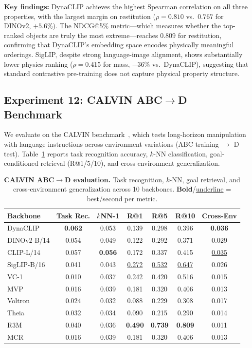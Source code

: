\documentclass{article}
\newcommand{\methodname}{DynaCLIP}
\newcommand{\best}[1]{\textbf{#1}}
\newcommand{\second}[1]{\underline{#1}}
\begin{document}
\textbf{Key findings:} \methodname{} achieves the highest Spearman correlation on all three properties, with the largest margin on restitution ($\rho{=}0.810$ vs.\ $0.767$ for DINOv2, $+5.6\%$). The NDCG@5\% metric---which measures whether the top-ranked objects are truly the most extreme---reaches $0.809$ for restitution, confirming that \methodname{}'s embedding space encodes physically meaningful orderings. SigLIP, despite strong language-image alignment, shows substantially lower physics ranking ($\rho{=}0.415$ for mass, $-36\%$ vs.\ \methodname{}), suggesting that standard contrastive pre-training does not capture physical property structure.


\subsection{Experiment 12: CALVIN ABC$\to$D Benchmark}
\label{sec:exp_calvin}

We evaluate on the CALVIN benchmark~\cite{mees2022calvin}, which tests long-horizon manipulation with language instructions across environment variations (ABC training $\to$ D test). Table~\ref{tab:calvin} reports task recognition accuracy, $k$-NN classification, goal-conditioned retrieval (R@1/5/10), and cross-environment generalization.

\begin{table}[t]
\centering
\caption{\textbf{CALVIN ABC$\to$D evaluation.} Task recognition, $k$-NN, goal retrieval, and cross-environment generalization across 10 backbones. \best{Bold}/\second{underline} = best/second per metric.}
\label{tab:calvin}
\small
\setlength{\tabcolsep}{3pt}
\begin{tabular}{@{}lcccccc@{}}
\toprule
\textbf{Backbone} & \textbf{Task Rec.} & \textbf{$k$NN-1} & \textbf{R@1} & \textbf{R@5} & \textbf{R@10} & \textbf{Cross-Env} \\
\midrule
\methodname{} & \best{0.062} & 0.053 & 0.139 & 0.298 & 0.396 & \best{0.036} \\
DINOv2-B/14 & 0.054 & 0.049 & 0.122 & 0.292 & 0.371 & 0.029 \\
CLIP-L/14 & 0.057 & \best{0.056} & 0.172 & 0.337 & 0.415 & \second{0.035} \\
SigLIP-B/16 & 0.041 & 0.043 & \second{0.272} & \second{0.532} & \second{0.647} & 0.026 \\
VC-1 & 0.010 & 0.037 & 0.242 & 0.420 & 0.516 & 0.015 \\
MVP & 0.016 & 0.039 & 0.181 & 0.320 & 0.406 & 0.013 \\
Voltron & 0.024 & 0.032 & 0.088 & 0.229 & 0.308 & 0.017 \\
Theia & 0.032 & 0.034 & 0.090 & 0.215 & 0.290 & 0.014 \\
R3M & 0.040 & 0.036 & \best{0.490} & \best{0.739} & \best{0.809} & 0.011 \\
MCR & 0.016 & 0.039 & 0.181 & 0.320 & 0.406 & 0.013 \\
\bottomrule
\end{tabular}
\vspace{-0.5em}
\end{table}
\end{document}
